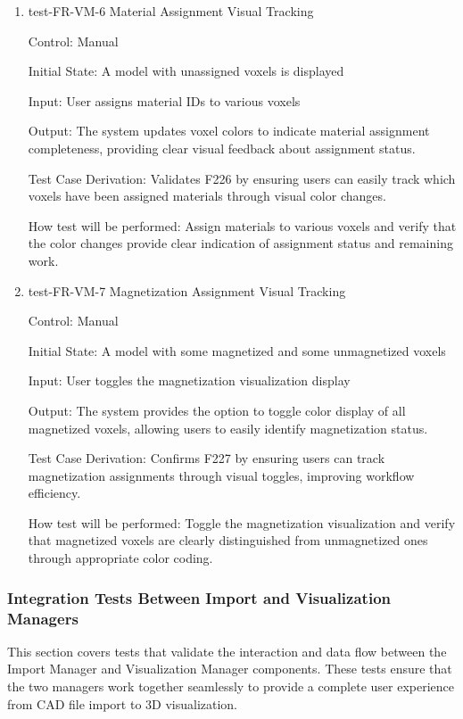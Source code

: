 \documentclass[12pt, titlepage]{article}
\begin{document}
\begin{enumerate}

\item{test-FR-VM-6 Material Assignment Visual Tracking\\}

Control: Manual
					
Initial State: A model with unassigned voxels is displayed
					
Input: User assigns material IDs to various voxels
					
Output: The system updates voxel colors to indicate material assignment completeness,
providing clear visual feedback about assignment status.

Test Case Derivation: Validates F226 by ensuring users can easily track which voxels
have been assigned materials through visual color changes.
					
How test will be performed: Assign materials to various voxels and verify that the
color changes provide clear indication of assignment status and remaining work.

\item{test-FR-VM-7 Magnetization Assignment Visual Tracking\\}

Control: Manual
					
Initial State: A model with some magnetized and some unmagnetized voxels
					
Input: User toggles the magnetization visualization display
					
Output: The system provides the option to toggle color display of all magnetized
voxels, allowing users to easily identify magnetization status.

Test Case Derivation: Confirms F227 by ensuring users can track magnetization
assignments through visual toggles, improving workflow efficiency.
					
How test will be performed: Toggle the magnetization visualization and verify that
magnetized voxels are clearly distinguished from unmagnetized ones through appropriate
color coding.

\end{enumerate}

\subsubsection{Integration Tests Between Import and Visualization Managers}

This section covers tests that validate the interaction and data flow between the Import Manager
and Visualization Manager components. These tests ensure that the two managers work together
seamlessly to provide a complete user experience from CAD file import to 3D visualization.
\end{document}
